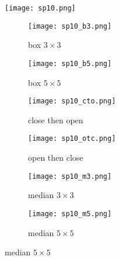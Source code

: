 \documentclass{article}
\begin{document}
\begin{figure}[ht]
    \centering
    \texttt{[image: sp10.png]}
    \caption{salt and pepper 0.10}
    \label{fig:top_image}

    \begin{subfigure}{0.3\textwidth}
        \texttt{[image: sp10\_b3.png]}
        \caption{box $3 \times 3$}
        \label{fig:sub1}
    \end{subfigure}
    \begin{subfigure}{0.3\textwidth}
        \texttt{[image: sp10\_b5.png]}
        \caption{box $5 \times 5$}
        \label{fig:sub2}
    \end{subfigure}

    \begin{subfigure}{0.3\textwidth}
        \texttt{[image: sp10\_cto.png]}
        \caption{close then open}
        \label{fig:sub3}
    \end{subfigure}%
    \begin{subfigure}{0.3\textwidth}
        \texttt{[image: sp10\_otc.png]}
        \caption{open then close}
        \label{fig:sub4}
    \end{subfigure}

    \begin{subfigure}{0.3\textwidth}
        \texttt{[image: sp10\_m3.png]}
        \caption{median $3 \times 3$}
        \label{fig:sub5}
    \end{subfigure}%
    \begin{subfigure}{0.3\textwidth}
        \texttt{[image: sp10\_m5.png]}
        \caption{median $5 \times 5$}
        \label{fig:sub6}
    \end{subfigure}

\end{figure}
\end{document}
